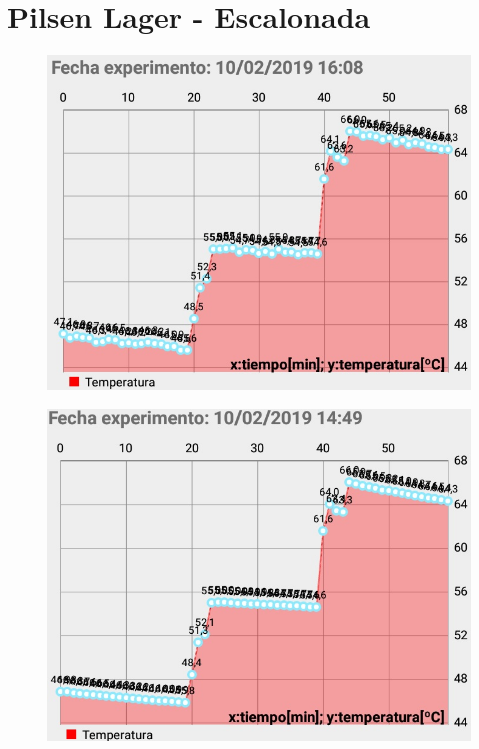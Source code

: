     \section{Pilsen Lager - Escalonada}
            \begin{figure}[H]
                \centering
                \includegraphics[scale=0.65]{Pruebas/EscalonadaExp1.jpg}
                \label{fig:EscExp1}
            \end{figure}
        
        
            \begin{figure}[H]
                \centering
                \includegraphics[scale=0.65]{Pruebas/EscalonadaExp2.jpg}
                \label{fig:EscExp2}
            \end{figure}
                
